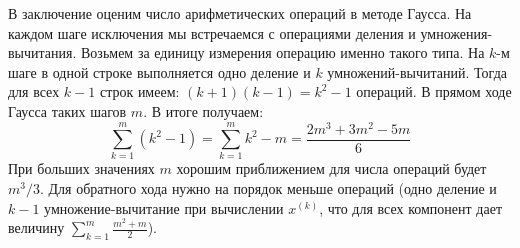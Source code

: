 \documentclass[../../calc-math-exam-2023.tex]{subfiles}
\begin{document}
    В заключение оценим число арифметических операций в методе Гаусса. На каждом шаге исключения мы встречаемся с
    операциями деления и умножения-вычитания. Возьмем за единицу измерения операцию именно такого типа. На $k$-м шаге
    в одной строке выполняется одно деление и $k$ умножений-вычитаний. Тогда для всех $k - 1$ строк имеем:
    $(k+1)(k-1) = k^2 - 1$ операций. В прямом ходе Гаусса таких шагов $m$. В итоге получаем:
    \begin{equation*}
        \sum_{k=1}^{m} \left( k^2 - 1 \right) = \sum_{k=1}^{m} k^2 - m = \frac{2m^3 + 3m^2 - 5m}{6}
    \end{equation*}
    При больших значениях $m$ хорошим приближением для числа операций будет $m^3/3$. Для обратного хода нужно на
    порядок меньше операций (одно деление и $k - 1$ умножение-вычитание при вычислении $\displaystyle x^{(k)}$, что
    для всех компонент дает величину $\displaystyle \sum_{k=1}^{m} \frac{m^2 + m}{2}$).
\end{document}
